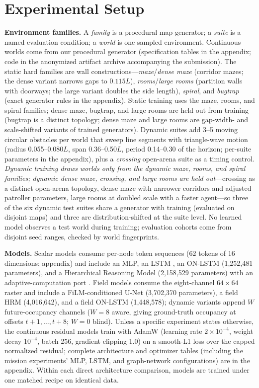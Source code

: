 \documentclass[letterpaper]{article} %
\begin{document}
\section{Experimental Setup}

\textbf{Environment families.} A \emph{family} is a procedural map generator; a \emph{suite} is a named evaluation condition; a \emph{world} is one sampled environment. Continuous worlds come from our procedural generator (specification tables in the appendix; code in the anonymized artifact archive accompanying the submission). The static hard families are wall constructions---\emph{maze}/\emph{dense maze} (corridor mazes; the dense variant narrows gaps to $0.115L$), \emph{rooms}/\emph{large rooms} (partition walls with doorways; the large variant doubles the side length), \emph{spiral}, and \emph{bugtrap} (exact generator rules in the appendix). Static training uses the maze, rooms, and spiral families; dense maze, bugtrap, and large rooms are held out from training (bugtrap is a distinct topology; dense maze and large rooms are gap-width- and scale-shifted variants of trained generators). Dynamic suites add 3--5 moving circular obstacles per world that sweep line segments with triangle-wave motion (radius 0.055--0.080$L$, span 0.36--0.50$L$, period 0.14--0.30 of the horizon; per-suite parameters in the appendix), plus a \emph{crossing} open-arena suite as a timing control. \emph{Dynamic training draws worlds only from the dynamic maze, rooms, and spiral families; dynamic dense maze, crossing, and large rooms are held out}---crossing as a distinct open-arena topology, dense maze with narrower corridors and adjusted patroller parameters, large rooms at doubled scale with a faster agent---so three of the six dynamic test suites share a generator with training (evaluated on disjoint maps) and three are distribution-shifted at the suite level. No learned model observes a test world during training; evaluation cohorts come from disjoint seed ranges, checked by world fingerprints.

\textbf{Models.} Scalar models consume per-node token sequences (62 tokens of 16 dimensions; appendix) and include an MLP, an LSTM \citep{hochreiter1997lstm}, an ON-LSTM \citep{shen2019onlstm} (1{,}252{,}481 parameters), and a Hierarchical Reasoning Model \citep[HRM;][]{wang2025hrm} (2{,}158{,}529 parameters) with an adaptive-computation port \citep{graves2016act,banino2021pondernet}. Field models consume the eight-channel $64{\times}64$ raster and include a FiLM-conditioned U-Net \citep{ronneberger2015unet,perez2018film} (3{,}702{,}370 parameters), a field HRM (4{,}016{,}642), and a field ON-LSTM (1{,}448{,}578); dynamic variants append $W$ future-occupancy channels ($W{=}8$ aware, giving ground-truth occupancy at offsets $t{+}1,\ldots,t{+}8$; $W{=}0$ blind). Unless a specific experiment states otherwise, the continuous residual models train with AdamW (learning rate $2{\times}10^{-4}$, weight decay $10^{-4}$, batch 256, gradient clipping 1.0) on a smooth-L1 loss over the capped normalized residual; complete architecture and optimizer tables (including the mission experiments' MLP, LSTM, and graph-network configurations) are in the appendix. Within each direct architecture comparison, models are trained under one matched recipe on identical data.
\end{document}
